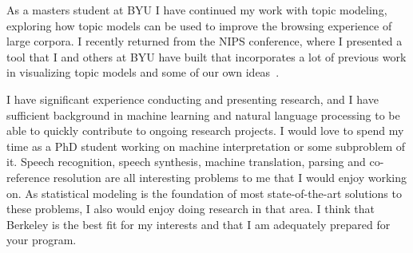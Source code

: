 \documentclass[onecolumn, 12pt]{article}
\begin{document}
As a masters student at BYU I have continued my work with topic modeling,
exploring how topic models can be used to improve the browsing experience of
large corpora.  I recently returned from the NIPS conference, where I presented
a tool that I and others at BYU have built that incorporates a lot of previous
work in visualizing topic models and some of our own
ideas~\cite{gardner-2010-topic-browser}.

I have significant experience conducting and presenting research, and I have
sufficient background in machine learning and natural language processing to be
able to quickly contribute to ongoing research projects.  I would love to spend
my time as a PhD student working on machine interpretation or some subproblem
of it.  Speech recognition, speech synthesis, machine translation, parsing and
co-reference resolution are all interesting problems to me that I would enjoy
working on.  As statistical modeling is the foundation of most state-of-the-art
solutions to these problems, I also would enjoy doing research in that area.
I think that Berkeley is the best fit for my interests and that I am adequately
prepared for your program.

\vspace{2mm}
\footnotesize

\renewcommand\bibsection{\noindent \small\textbf{Publications}\vspace{-2mm}\footnotesize}

\end{document}
